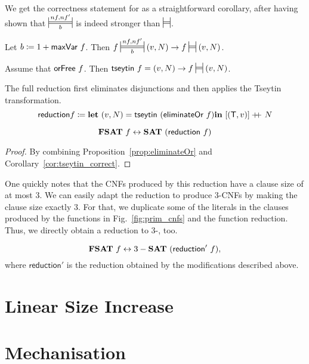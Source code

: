 We get the correctness statement for \tseytin{} as a straightforward corollary, after having shown that $\Frepr{nf}{nf'}{b}$ is indeed stronger than $\frepr$.

\begin{proposition}
  Let $b \coloneqq 1 +{\textsf{maxVar}{}~f}$. Then $f \Frepr{nf}{nf'}{b} (v, N) \rightarrow f \frepr{} (v, N)$. 
\end{proposition}

\begin{corollary}\label{cor:tseytin_correct}
  Assume that $\textsf{orFree}~f$. Then $\tseytin~f = (v, N) \rightarrow f \frepr{} (v, N)$. 
\end{corollary}

The full reduction first eliminates disjunctions and then applies the Tseytin transformation.
\[\textsf{reduction} f \coloneqq \textbf{let}~ (v, N) = \textsf{tseytin}~(\textsf{eliminateOr}~f) \textbf{in}~ [(\mathsf{T}, v)] +\kern-1.3ex+\kern0.8ex N \]
\begin{lemma}
  \[\textbf{FSAT}{}~f \leftrightarrow \textbf{SAT}{}~(\textsf{reduction}~f) \]
\end{lemma}
\begin{proof}
  By combining Proposition~\ref{prop:eliminateOr} and Corollary~\ref{cor:tseytin_correct}.
\end{proof}

One quickly notes that the CNFs produced by this reduction have a clause size of at most 3. We can easily adapt the reduction to produce 3-CNFs by making the clause size exactly 3. For that, we duplicate some of the literals in the clauses produced by the functions in Fig.~\ref{fig:prim_cnfs} and the function \textsf{reduction}.
Thus, we directly obtain a reduction to 3-\SAT{}, too.

\begin{lemma}
  \[\textbf{FSAT}{}~f \leftrightarrow 3-\textbf{SAT}{}~(\textsf{reduction}'~f), \]
  where $\textsf{reduction}'$ is the reduction obtained by the modifications described above.
\end{lemma}

\section{Linear Size Increase}

\section{Mechanisation}
